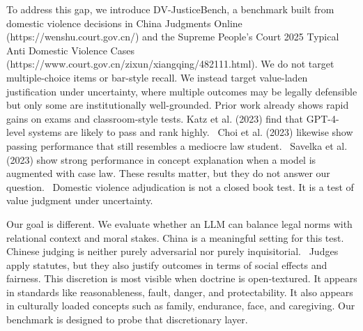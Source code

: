 \documentclass[pdflatex,sn-mathphys-ay]{sn-jnl}%
\theoremstyle{thmstyleone}%
\theoremstyle{thmstyletwo}%
\theoremstyle{thmstylethree}%
\begin{document}
To address this gap, we introduce DV-JusticeBench, a benchmark built from domestic violence decisions in China Judgments Online (https://wenshu.court.gov.cn/) and the Supreme People's Court 2025 Typical Anti Domestic Violence Cases (https://www.court.gov.cn/zixun/xiangqing/482111.html). We do not target multiple-choice items or bar-style recall. We instead target value-laden justification under uncertainty, where multiple outcomes may be legally defensible but only some are institutionally well-grounded. Prior work already shows rapid gains on exams and classroom-style tests. Katz et al. (2023) find that GPT-4-level systems are likely to pass and rank highly.~\cite{katz_gpt-4_2024} Choi et al. (2023) likewise show passing performance that still resembles a mediocre law student.~\cite{choi_chatgpt_2023} Savelka et al. (2023) show strong performance in concept explanation when a model is augmented with case law. These results matter, but they do not answer our question.~\cite{savelka_explaining_2023} Domestic violence adjudication is not a closed book test. It is a test of value judgment under uncertainty.

Our goal is different. We evaluate whether an LLM can balance legal norms with relational context and moral stakes. China is a meaningful setting for this test. Chinese judging is neither purely adversarial nor purely inquisitorial.~\cite{liu_mixing_2001} Judges apply statutes, but they also justify outcomes in terms of social effects and fairness. This discretion is most visible when doctrine is open-textured. It appears in standards like reasonableness, fault, danger, and protectability. It also appears in culturally loaded concepts such as family, endurance, face, and caregiving. Our benchmark is designed to probe that discretionary layer.
\end{document}
